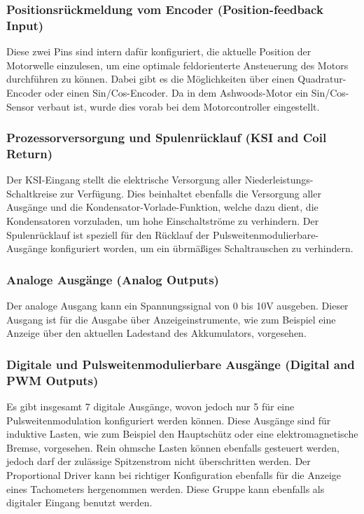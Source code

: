 \subsubsection{Positionsrückmeldung vom Encoder (Position-feedback Input)}
Diese zwei Pins sind intern dafür konfiguriert, die aktuelle Position der Motorwelle einzulesen, um eine optimale feldorienterte Ansteuerung des Motors durchführen zu können. Dabei gibt es die Möglichkeiten über einen Quadratur-Encoder oder einen Sin/Cos-Encoder. Da in dem Ashwoods-Motor ein Sin/Cos-Sensor verbaut ist, wurde dies vorab bei dem Motorcontroller eingestellt.



\subsubsection{Prozessorversorgung und Spulenrücklauf (KSI and Coil Return)}
Der KSI-Eingang stellt die elektrische Versorgung aller Niederleistungs-Schaltkreise zur Verfügung. Dies  beinhaltet ebenfalls die Versorgung aller Ausgänge und die Kondensator-Vorlade-Funktion, welche dazu dient, die Kondensatoren vorzuladen, um hohe Einschaltströme zu verhindern. Der Spulenrücklauf ist speziell für den Rücklauf der Pulsweitenmodulierbare-Ausgänge konfiguriert worden, um ein übrmäßiges Schaltrauschen zu verhindern.



\subsubsection{Analoge Ausgänge (Analog Outputs)}
Der analoge Ausgang kann ein Spannungssignal von 0 bis 10V ausgeben. Dieser Ausgang ist für die Ausgabe über Anzeigeinstrumente, wie zum Beispiel eine Anzeige über den aktuellen Ladestand des Akkumulators, vorgesehen.



\subsubsection{Digitale und Pulsweitenmodulierbare Ausgänge (Digital and PWM Outputs)}
Es gibt insgesamt 7 digitale Ausgänge, wovon jedoch nur 5 für eine Pulsweitenmodulation konfiguriert werden können. Diese Ausgänge sind für induktive Lasten, wie zum Beispiel den Hauptschütz oder eine elektromagnetische Bremse, vorgesehen. Rein ohmsche Lasten können ebenfalls gesteuert werden, jedoch darf der zulässige Spitzenstrom nicht überschritten werden. Der Proportional Driver kann bei richtiger Konfiguration ebenfalls für die Anzeige eines Tachometers hergenommen werden. Diese Gruppe kann ebenfalls als digitaler Eingang benutzt werden.



